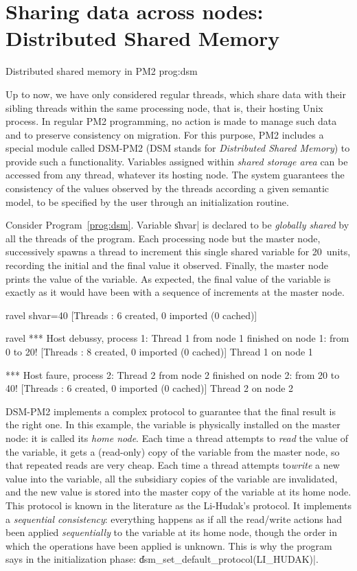 \section{Sharing data across nodes: Distributed Shared Memory}

 {Distributed shared memory in PM2}
{prog:dsm}

Up to now, we have only considered regular threads, which share data
with their sibling threads within the same processing node, that is,
their hosting Unix process. In regular PM2 programming, no action is
made to manage such data and to preserve consistency on migration.
For this purpose, PM2 includes a special module called DSM-PM2 (DSM
stands for \emph{Distributed Shared Memory}) to provide such a
functionality. Variables assigned within \emph{shared storage area}
can be accessed from any thread, whatever its hosting node. The system
guarantees the consistency of the values observed by the threads
according a given semantic model, to be specified by the user through
an initialization routine. 

Consider Program~\ref{prog:dsm}. Variable \|shvar| is declared to be
\emph{globally shared} by all the threads of the program.  Each
processing node but the master node, successively spawns a thread to
increment this single shared variable for 20~units, recording the
initial and the final value it observed.  Finally, the master node
prints the value of the variable.  As expected, the final value of the
variable is exactly as it would have been with a sequence of
increments at the master node.
\begin{shell}
ravel%
shvar=40
[Threads : 6 created, 0 imported (0 cached)]

ravel%
*** Host debussy, process 1:
Thread 1 from node 1 finished on node 1: from 0 to 20!
[Threads : 8 created, 0 imported (0 cached)]
Thread 1 on node 1

*** Host faure, process 2:
Thread 2 from node 2 finished on node 2: from 20 to 40!
[Threads : 6 created, 0 imported (0 cached)]
Thread 2 on node 2
\end{shell}

DSM-PM2 implements a complex protocol to guarantee that the final
result is the right one. In this example, the variable is physically
installed on the master node: it is called its \emph{home node}. Each
time a thread attempts to \emph{read} the value of the variable, it
gets a (read-only) copy of the variable from the master node, so that
repeated reads are very cheap. Each time a thread attempts
to\emph{write} a new value into the variable, all the subsidiary
copies of the variable are invalidated, and the new value is stored
into the master copy of the variable at its home node. This protocol
is known in the literature as the Li-Hudak's protocol. It implements a
\emph{sequential consistency}: everything happens as if all the
read/write actions had been applied \emph{sequentially} to the
variable at its home node, though the order in which the operations
have been applied is unknown. This is why the program says in the
initialization phase: \|dsm_set_default_protocol(LI_HUDAK)|.

